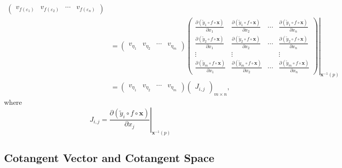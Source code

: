 \documentclass{report}
\begin{document}
{\[\begin{aligned}
\begin{pmatrix}
            v_{f(\varepsilon_1)}&v_{f(\varepsilon_2)}&\cdots&v_{f(\varepsilon_n)}
            \end{pmatrix}\\
            &=
            \begin{pmatrix}
            v_{\eta_1}&v_{\eta_2}&\cdots&v_{\eta_m}
            \end{pmatrix}
            \left.\begin{pmatrix}
                \frac{\partial(\tilde{y}_1 \circ f\circ\mathbf{x})}{\partial x_1}&\frac{\partial(\tilde{y}_1 \circ f\circ\mathbf{x})}{\partial x_2}&\cdots&\frac{\partial(\tilde{y}_1 \circ f\circ\mathbf{x})}{\partial x_n}\\
                \frac{\partial(\tilde{y}_2 \circ f\circ\mathbf{x})}{\partial x_1}&\frac{\partial(\tilde{y}_2 \circ f\circ\mathbf{x})}{\partial x_2}&\cdots&\frac{\partial(\tilde{y}_2 \circ f\circ\mathbf{x})}{\partial x_n}\\
                \vdots&\vdots&&\vdots\\
                \frac{\partial(\tilde{y}_m \circ f\circ\mathbf{x})}{\partial x_1}&\frac{\partial(\tilde{y}_m \circ f\circ\mathbf{x})}{\partial x_2}&\cdots&\frac{\partial(\tilde{y}_m \circ f\circ\mathbf{x})}{\partial x_n}
            \end{pmatrix}\right|_{\mathbf{x}^{-1}(p)}\\
            &=
            \begin{pmatrix}
            v_{\eta_1}&v_{\eta_2}&\cdots&v_{\eta_m}
            \end{pmatrix}
            \begin{pmatrix}
           J_{i,j}
           \end{pmatrix}_{m\times n},
        \end{aligned}
    \]
    where
    \[
        J_{i,j}=\left.\frac{\partial(\tilde{y}_i \circ f\circ\mathbf{x})}{\partial x_j}\right|_{\mathbf{x}^{-1}(p)}
        \]
}

\subsection{Cotangent Vector and Cotangent Space}
\end{document}
